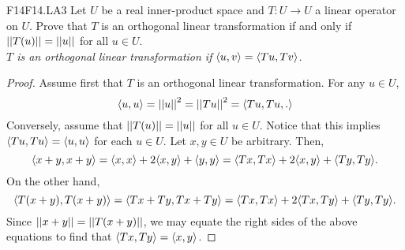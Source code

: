 \documentclass[../../AlgebraQualSolutions.tex]{subfiles}
\begin{document}
    \begin{prob}{F14}{F14.LA3}
        Let $U$ be a real inner-product space and $T: U \to U$ a linear operator on $U$. Prove that $T$ is an orthogonal linear transformation if and only if $\norm[T(u)] = \norm[u]$ for all $u \in U$.\\
    
        \emph{$T$ is an orthogonal linear transformation if $\ip{u}{v} = \ip{Tu}{Tv}$}.
    \end{prob}
    
    \begin{proof}
        Assume first that $T$ is an orthogonal linear transformation. For any $u \in U$,
            \[\ip{u}{u} = \norm[u]^2 = \norm[Tu]^2 = \ip{Tu,Tu}.\]
        Conversely, assume that $\norm[T(u)] = \norm[u]$ for all $u \in U$. Notice that this implies $\ip{Tu}{Tu} = \ip{u}{u}$ for each $u \in U$. Let $x, y \in U$ be arbitrary. Then,
            \[\ip{x+y}{x+y} = \ip{x}{x} + 2\ip{x}{y} + \ip{y}{y} = \ip{Tx}{Tx} + 2\ip{x}{y} + \ip{Ty}{Ty}.\]
        On the other hand,
            \[\ip{T(x+y)}{T(x+y)} = \ip{Tx + Ty}{Tx + Ty} = \ip{Tx}{Tx} + 2\ip{Tx}{Ty} + \ip{Ty}{Ty}.\]
        Since $\norm[x + y] = \norm[T(x+y)]$, we may equate the right sides of the above equations to find that $\ip{Tx}{Ty} = \ip{x}{y}$.
    \end{proof}
\end{document}
